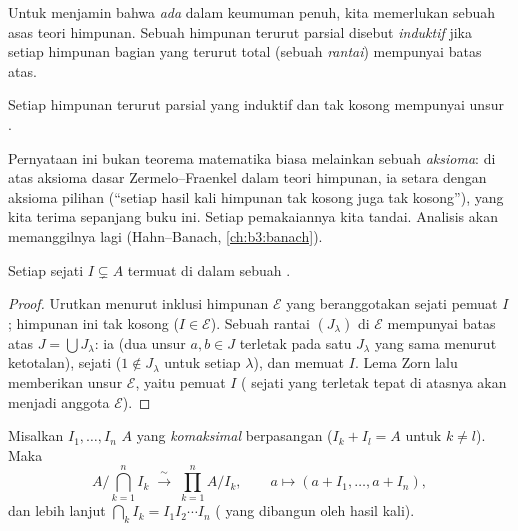 Untuk menjamin bahwa  \emph{ada} dalam keumuman penuh,
kita memerlukan sebuah asas teori himpunan. Sebuah himpunan terurut parsial disebut
\emph{induktif} jika setiap himpunan bagian yang terurut total (sebuah \emph{rantai})
mempunyai batas atas.

\begin{theorem}\label{thm:b3:rings:zorn}
Setiap himpunan terurut parsial yang induktif dan tak kosong mempunyai unsur
.
\admitted
\end{theorem}

\begin{remark}\label{rem:b3:rings:zorn}
Pernyataan ini bukan teorema matematika biasa melainkan sebuah \emph{aksioma}:
di atas aksioma dasar Zermelo--Fraenkel dalam teori
himpunan, ia setara dengan aksioma pilihan (``setiap hasil kali himpunan tak kosong
juga tak kosong''), yang kita terima sepanjang buku ini. Setiap
pemakaiannya kita tandai. Analisis akan memanggilnya lagi (Hahn--Banach,
\cref{ch:b3:banach}).
\end{remark}

\begin{theorem}[Krull]\label{thm:b3:rings:krull}
Setiap  sejati $I \subsetneq A$ termuat di dalam sebuah .
\end{theorem}

\begin{proof}
Urutkan menurut inklusi himpunan $\mathcal E$ yang beranggotakan  sejati
pemuat $I$; himpunan ini tak kosong ($I \in \mathcal E$). Sebuah rantai
$(J_\lambda)$ di $\mathcal E$ mempunyai batas atas $J = \bigcup
J_\lambda$: ia  (dua unsur $a, b \in J$ terletak pada satu $J_\lambda$
yang sama menurut ketotalan), sejati ($1 \notin J_\lambda$ untuk setiap $\lambda$),
dan memuat $I$. Lema Zorn lalu memberikan unsur  $\mathcal
E$, yaitu  pemuat $I$ ( sejati yang terletak tepat
di atasnya akan menjadi anggota $\mathcal E$).
\end{proof}

\begin{theorem}\label{thm:b3:rings:crt}
Misalkan $I_1, \dots, I_n$  $A$ yang \emph{komaksimal} berpasangan ($I_k + I_l = A$ untuk $k \neq l$). Maka
\[
A\Big/\bigcap_{k=1}^n I_k \;\xrightarrow{\;\sim\;}\;
\prod_{k=1}^n A/I_k,
\qquad
a \longmapsto (a + I_1, \dots, a + I_n),
\]
dan lebih lanjut $\bigcap_k I_k = I_1 I_2 \cdots I_n$ ( yang
dibangun oleh hasil kali).
\end{theorem}

